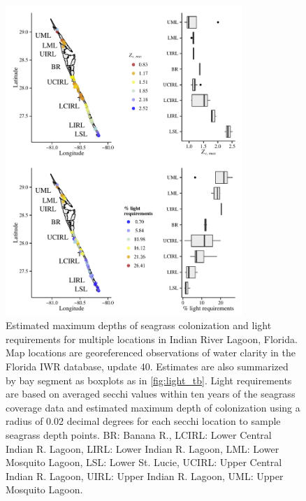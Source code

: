 \documentclass[letterpaper,12pt,oneside]{article}\usepackage[]{graphicx}\usepackage[]{color}
\begin{document}
\begin{figure}
\centering
\includegraphics[width = 0.8\textwidth]{figs/light_irl.pdf}
\caption{Estimated maximum depths of seagrass colonization and light requirements for multiple locations in Indian River Lagoon, Florida.  Map locations are georeferenced observations of water clarity in the Florida \acl{IWR} database, update 40.  Estimates are also summarized by bay segment as boxplots as in \cref{fig:light_tb}. Light requirements are based on averaged secchi values within ten years of the seagrass coverage data and estimated maximum depth of colonization using a radius of 0.02 decimal degrees for each secchi location to sample seagrass depth points. BR: Banana R., LCIRL: Lower Central Indian R. Lagoon, LIRL: Lower Indian R. Lagoon, LML: Lower Mosquito Lagoon, LSL: Lower St. Lucie, UCIRL: Upper Central Indian R. Lagoon, UIRL: Upper Indian R. Lagoon, UML: Upper Mosquito Lagoon.}
\label{fig:light_irl}
\end{figure}
\end{document}

